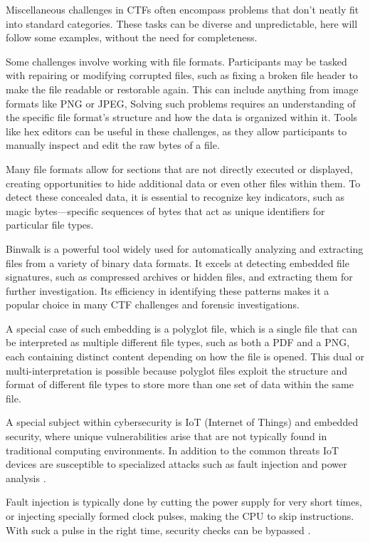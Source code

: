 \documentclass[conference]{IEEEtran}
\begin{document}
Miscellaneous challenges in CTFs often encompass problems that don't neatly fit
into standard categories.
These tasks can be diverse and unpredictable, here will follow some examples, without
the need for completeness. 

Some challenges involve
working with file formats. Participants may be tasked with repairing or
modifying corrupted files, such as fixing a broken file header to make the file
readable or restorable again. This can include anything from image formats like
PNG or JPEG, 
Solving such problems requires an understanding of the specific file format’s
structure and how the data is organized within it. Tools like hex editors can
be useful in these challenges, as they allow participants to manually inspect
and edit the raw bytes of a file.

Many file formats allow for sections that are not directly executed or
displayed, creating opportunities to hide additional data or even other files
within them. To detect these concealed data,
it is essential to recognize key indicators, such as magic bytes—specific
sequences of bytes that act as unique identifiers for particular file types.

Binwalk is a powerful tool widely used for automatically analyzing and
extracting files from a variety of binary data formats. It excels at detecting
embedded file signatures, such as compressed archives or hidden files, and
extracting them for further investigation. Its efficiency in identifying these
patterns makes it a popular choice in many CTF challenges and forensic
investigations.

A special case of such embedding is a polyglot file, which is a single
file that can be interpreted as multiple different
file types, such as both a PDF and a PNG, each containing distinct content
depending on how the file is opened. This dual or multi-interpretation is
possible because polyglot files exploit the structure and format of different
file types to store more than one set of data within the same file.

A special subject within cybersecurity is IoT (Internet of Things) and embedded
security, where unique vulnerabilities arise that are not typically found in
traditional computing environments. In addition to the common threats IoT
devices are susceptible to
specialized attacks such as fault injection and power analysis
\cite{butun2019}.

Fault injection is typically done by cutting the power supply for very short
times, or injecting specially formed clock pulses, making the CPU to skip instructions.
With suck a pulse in the right time, security checks can be bypassed
\cite{ziade2004}.
\end{document}
